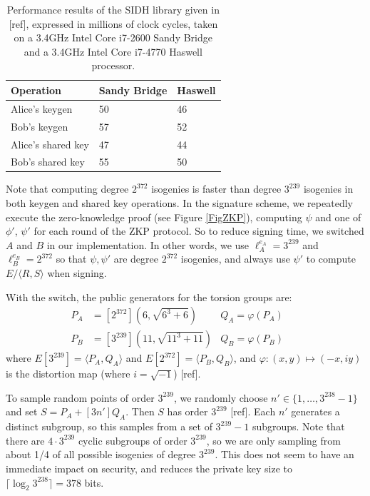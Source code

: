 \documentclass{amsart}
\theoremstyle{plain}
\theoremstyle{remark}
\numberwithin{equation}{section}
\begin{document}
\begin{table}[ht]
\centering
\begin{tabular}{l|l|l}
Operation			&	Sandy Bridge	&	Haswell \\ \hline
Alice's keygen		&	50				&	46		\\
Bob's keygen		&	57				&	52		\\
Alice's shared key 	&	47				&	44		\\
Bob's shared key 	&	55 				&	50		
\end{tabular}
\caption{Performance results of the SIDH library given in [ref], expressed in millions of clock cycles, taken on a 3.4GHz Intel Core i7-2600 Sandy Bridge and a 3.4GHz Intel Core i7-4770 Haswell processor.}
\end{table}

Note that computing degree $2^{372}$ isogenies is faster than degree $3^{239}$ isogenies in both keygen and shared key operations.
In the signature scheme, we repeatedly execute the zero-knowledge proof (see Figure \ref{FigZKP}), computing $\psi$ and one of $\phi'$, $\psi'$ for each round of the ZKP protocol. So to reduce signing time, we switched $A$ and $B$ in our implementation. In other words, we use $\ell_A^{e_A} = 3^{239}$ and $\ell_B^{e_B} = 2^{372}$ so that $\psi,\psi'$ are degree $2^{372}$ isogenies, and always use $\psi'$ to compute $E/\langle R,S\rangle$ when signing.

With the switch, the public generators for the torsion groups are:
\begin{align*}
P_A &= [2^{372}](6, \sqrt{6^3+6}) 	& Q_A = \varphi(P_A)	&& \\
P_B &= [3^{239}](11,\sqrt{11^3+11}) 	& Q_B = \varphi(P_B) &&
\end{align*}
where $E[3^{239}] = \langle P_A,Q_A\rangle$ and $E[2^{372}] = \langle P_B, Q_B\rangle$,
and $\varphi: (x,y) \mapsto (-x,iy)$ is the distortion map (where $i = \sqrt{-1}$) [ref].

To sample random points of order $3^{239}$, we randomly choose $n' \in \{1,\dots, 3^{238}-1\}$ and set $S = P_A + [3n']Q_A$. Then $S$ has order $3^{239}$ [ref]. Each $n'$ generates a distinct subgroup, so this samples from a set of $3^{239}-1$ subgroups. Note that there are $4\cdot 3^{239}$ cyclic subgroups of order $3^{239}$, so we are only sampling from about 1/4 of all possible isogenies of degree $3^{239}$. This does not seem to have an immediate impact on security, and reduces the private key size to $\lceil \log_2 3^{238} \rceil = 378$ bits.
\end{document}
